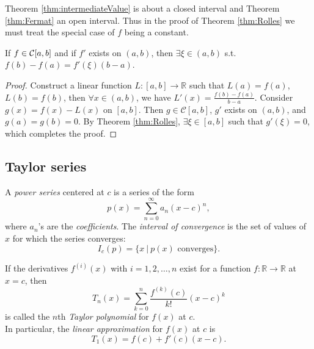 \begin{rem}
Theorem \ref{thm:intermediateValue} is about a closed interval
 and Theorem \ref{thm:Fermat} an open interval.
Thus in the proof of Theorem \ref{thm:Rolles}
 we must treat the special case of $f$ being a constant.
\end{rem}

\begin{thm}
  \label{thm:meanValue}
  If $f\in {\cal C}[a,b]$ and if $f'$ exists on $(a,b)$,
  then $\exists \xi\in(a,b)$
  s.t. $f(b)-f(a)=f'(\xi)(b-a)$.
\end{thm}
\begin{proof}
  Construct a linear function
   $L:[a,b]\rightarrow\mathbb{R}$ such that
   $L(a)=f(a)$, $L(b)=f(b)$,
   then $\forall x\in (a,b)$,
   we have $L'(x)=\frac{f(b)-f(a)}{b-a}$.
  Consider $g(x)=f(x)-L(x)$ on $[a,b]$.
  Then $g\in \mathcal{C}[a,b]$, $g'$ exists on $(a,b)$,
  and $g(a)=g(b)=0$.
  By Theorem \ref{thm:Rolles}, $\exists \xi\in[a,b]$
   such that $g'(\xi)=0$,
   which completes the proof.
\end{proof}


\subsection{Taylor series}
\label{sec:Taylorseries}

\begin{defn}
  \label{def:powerSeries}
  A \emph{power series} centered at $c$
   is a series of the form
   \begin{equation}
     \label{eq:powerSeries}
     p(x)=\sum_{n=0}^{\infty} a_n (x-c)^n,
   \end{equation}
   where $a_n$'s are the \emph{coefficients}.
  The \emph{interval of convergence}
   is the set of values of $x$ for which the series converges:
   \begin{equation}
     \label{eq:intervalOfConvergence}
     I_c(p) = \{x\ |\ p(x) \text{ converges} \}.
   \end{equation}
\end{defn}

\begin{defn}
  \label{def:TaylorPolynomial}
  If the derivatives $f^{(i)}(x)$ with $i=1,2,\ldots,n$ exist for a function
  $f: \mathbb{R}\rightarrow \mathbb{R}$ at $x=c$,
   then
   \begin{equation}
     \label{eq:partialSumTaylor}
     T_n(x) = \sum_{k=0}^{n}\frac{f^{(k)}(c)}{k!}(x-c)^k
   \end{equation}
   is called the $n$th \emph{Taylor polynomial} for $f(x)$ at $c$.
\\  In particular, 
the \emph{linear approximation} for $f(x)$ at $c$ is
   \begin{equation}
     \label{eq:linearTaylor}
     T_1(x) = f(c) + f'(c)(x-c).
   \end{equation}
 \end{defn}

